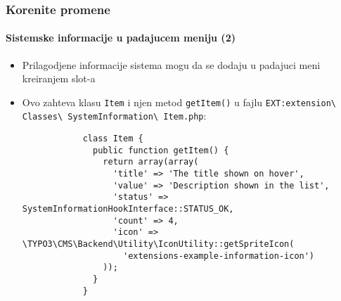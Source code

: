 \begin{frame}[fragile]
	\frametitle{Korenite promene}
	\framesubtitle{Sistemske informacije u padajucem meniju (2)}

	\lstset{basicstyle=\tiny\ttfamily}

	\begin{itemize}

		\item Prilagodjene informacije sistema mogu da se dodaju u padajuci meni kreiranjem slot-a

		\item Ovo zahteva klasu \texttt{Item} i njen metod \texttt{getItem()} u fajlu
			\small
				\texttt{EXT:extension\textbackslash
					Classes\textbackslash
					SystemInformation\textbackslash
					Item.php}:
			\normalsize

		\begin{lstlisting}
			class Item {
			  public function getItem() {
			    return array(array(
			      'title' => 'The title shown on hover',
			      'value' => 'Description shown in the list',
			      'status' => SystemInformationHookInterface::STATUS_OK,
			      'count' => 4,
			      'icon' => \TYPO3\CMS\Backend\Utility\IconUtility::getSpriteIcon(
				    'extensions-example-information-icon')
			    ));
			  }
			}
		\end{lstlisting}

	\end{itemize}

\end{frame}

